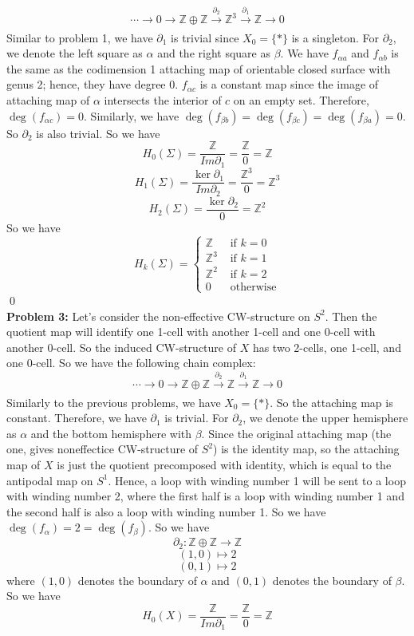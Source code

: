 \documentclass[12pt]{amsart}
\newcommand{\Z}{\mathbb{Z}}
\begin{document}
\[\cdots\to0\to \Z\oplus \Z\xrightarrow[]{\partial_2}\Z^3\xrightarrow[]{\partial_1}\Z\to 0\]
Similar to problem 1, we have $\partial_1$ is trivial since $X_0=\{\ast\}$ is a singleton. For $\partial_2$, we denote the left square as $\alpha$ and the right square as $\beta$. We have $f_{\alpha a}$ and $f_{\alpha b}$ is the same as the codimension 1 attaching map of orientable closed surface with genus 2; hence, they have degree 0. $f_{\alpha c}$ is a constant map since the image of attaching map of $\alpha$ intersects the interior of $c$ on an empty set. Therefore, $\deg(f_{\alpha c})=0$. Similarly, we have $\deg(f_{\beta b})=\deg(f_{\beta c})=\deg (f_{\beta a})=0$. So $\partial_2$ is also trivial. So we have 
\[H_0(\Sigma)=\frac{\Z}{Im \partial_1}=\frac{\Z}{0}=\Z\]
\[H_1(\Sigma)=\frac{\ker \partial_1}{Im \partial_2}=\frac{\Z^{3}}{0}=\Z^{3}\]
\[H_2(\Sigma)=\frac{\ker \partial_2}{0}=\Z^2\]
So we have 
\[H_k(\Sigma)=\begin{cases}
    \Z & \text{ if }k=0\\
    \Z^{3} &\text{ if }k=1\\
    \Z^{2} &\text{ if }k=2\\
    0&\text{ otherwise}
\end{cases}\]
\qed\\
\textbf{Problem 3:} Let's consider the non-effective CW-structure on $S^2$. Then the quotient map will identify one 1-cell with another 1-cell and one 0-cell with another 0-cell. So the induced CW-structure of $X$ has two 2-cells, one 1-cell, and one 0-cell. So we have the following chain complex:
\[\cdots \to 0\to \Z\oplus \Z\xrightarrow[]{\partial_2}\Z\xrightarrow[]{\partial_1}\Z\to 0\]
Similarly to the previous problems, we have $X_0=\{\ast\}$. So the attaching map is constant. Therefore, we have $\partial_1$ is trivial. For $\partial_2$, we denote the upper hemisphere as $\alpha$ and the bottom hemisphere with $\beta$. Since the original attaching map (the one, gives noneffectice CW-structure of $S^2$) is the identity map, so the attaching map of $X$ is just the quotient precomposed with identity, which is equal to the antipodal map on $S^1$. Hence, a loop with winding number 1 will be sent to a loop with winding number 2, where the first half is a loop with winding number 1 and the second half is also a loop with winding number 1. So we have $\deg(f_\alpha)=2=\deg(f_\beta)$. So we have 
\[\partial_2: \Z\oplus \Z \to \Z\]
\[(1,0)\mapsto 2\]
\[(0,1)\mapsto 2\]
where $(1,0)$ denotes the boundary of $\alpha$ and $(0,1)$ denotes the boundary of $\beta$.
So we have  
\[H_0(X)=\frac{\Z}{Im \partial_1}=\frac{\Z}{0}=\Z\]
\end{document}
